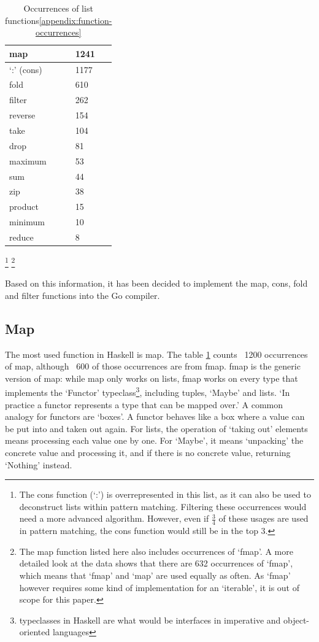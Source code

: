 \begin{table}[htb]
\centering
\caption{Occurrences of list functions\ref{appendix:function-occurrences}}\label{tab:occurrences-list-funcs}
\begin{tabular}{ll}
\toprule
map & 1241 \\
\midrule
`:' (cons) & 1177 \\
\midrule
fold & 610 \\
\midrule
filter & 262 \\
\midrule
reverse & 154 \\
\midrule
take & 104 \\
\midrule
drop & 81 \\
\midrule
maximum & 53 \\
\midrule
sum & 44 \\
\midrule
zip & 38 \\
\midrule
product & 15 \\
\midrule
minimum & 10 \\
\midrule
reduce & 8
\end{tabular}
\end{table}
\footnote{The cons function (`:') is overrepresented in this list,
    as it can also be used to deconstruct lists within pattern matching. Filtering
    these occurrences would need a more advanced algorithm. However, even if $\tfrac{3}{4}$
    of these usages are used in pattern matching, the cons function would still be
    in the top 3.
}
\footnote{The map function listed here also includes occurrences of `fmap'. A more
    detailed look at the data shows that there are 632 occurrences of `fmap', which
    means that `fmap' and `map' are used equally as often. As `fmap' however requires
    some kind of implementation for an `iterable', it is out of scope for this paper.
}

Based on this information, it has been decided to implement the map, cons, fold
and filter functions into the Go compiler.

\subsection{Map}

The most used function in Haskell is map. The table \ref{tab:occurrences-list-funcs}
counts ~1200 occurrences of map, although ~600 of those occurrences are from
fmap. fmap is the generic version of map: while map only works on lists, fmap
works on every type that implements the `Functor' typeclass\footnote{typeclasses
    in Haskell are what would be interfaces in imperative and object-oriented
languages}, including tuples, `Maybe' and lists.
`In practice a functor represents a type that can be mapped over.'\autocite{functor-wiki}
A common analogy for functors are `boxes'. A functor behaves like a box where
a value can be put into and taken out again. For lists, the operation of `taking out'
elements means processing each value one by one. For `Maybe', it means `unpacking' the
concrete value and processing it, and if there is no concrete value, returning `Nothing'
instead.

